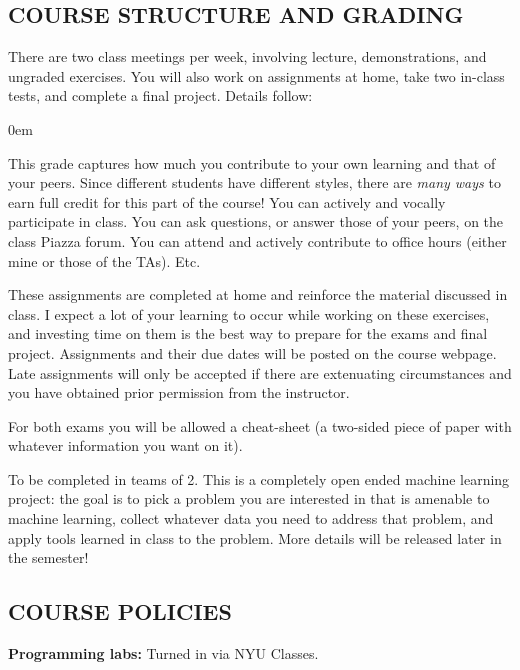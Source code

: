 \documentclass[10pt]{article}
\begin{document}
\subsection{COURSE STRUCTURE AND GRADING}
There are two class meetings per week, involving lecture, demonstrations, and ungraded exercises. You will also work on assignments at home, take two in-class tests, and complete a final project. Details follow:

	\begin{description}\itemsep0em 
		\item[Class participation (10\% of grade).] This grade captures how much you contribute to your own learning and that of your peers. Since different students have different styles, there are \emph{many ways} to earn full credit for this part of the course! You can actively and vocally participate in class. You can ask questions, or answer those of your peers, on the class Piazza forum. You can attend and actively contribute to office hours (either mine or those of the TAs). Etc. 
		\item[Weekly programming labs and written problem sets (30\% of grade).] These assignments are completed at home and reinforce the material discussed in class. I expect a lot of your learning to occur while working on these exercises, and investing time on them is the best way to prepare for the exams and final project. Assignments and their due dates will be posted on the course webpage. Late assignments will only be accepted if there are extenuating circumstances and you have obtained prior permission from the instructor.
		\item[Two in-class midterm exams (20\% each, 40\% total).] For both exams you will be allowed a cheat-sheet (a two-sided piece of paper with whatever information you want on it).
		\item[Final project (20\% of grade)] To be completed in teams of 2. This is a completely open ended machine learning project: the goal is to pick a problem you are interested in that is amenable to machine learning, collect whatever data you need to address that problem, and apply tools learned in class to the problem. More details will be released later in the semester!
	\end{description}


\subsection{COURSE POLICIES}
\medskip\noindent\textbf{Programming labs:} Turned in via NYU Classes. 
\end{document}

